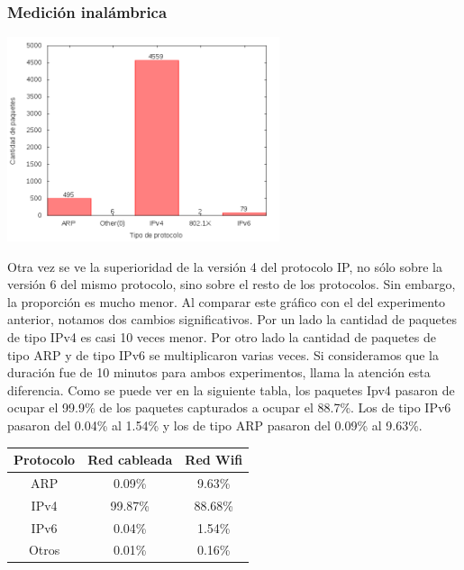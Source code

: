 \subsubsection{Medición inalámbrica}

\begin{center}
\includegraphics[width=8cm]{../mediciones/home-wfi-10/home-wfi-10Protocolos.png}
\end{center}

Otra vez se ve la superioridad de la versión 4 del protocolo IP, no sólo sobre la versión 6 del mismo protocolo, sino sobre el resto de los protocolos.
Sin embargo, la proporción es mucho menor. Al comparar este gráfico con el del experimento anterior, notamos dos cambios significativos. Por un lado la cantidad
de paquetes de tipo IPv4 es casi 10 veces menor. Por otro lado la cantidad de paquetes de tipo ARP y de tipo IPv6 se multiplicaron varias veces. Si consideramos
que la duración fue de 10 minutos para ambos experimentos, llama la atención esta diferencia. Como se puede ver en la siguiente tabla, los paquetes Ipv4 pasaron
de ocupar el 99.9\% de los paquetes capturados a ocupar el 88.7\%. Los de tipo IPv6 pasaron del 0.04\% al 1.54\% y los de tipo ARP pasaron del 0.09\% al 9.63\%.

\begin{center}
\begin{tabular}{|c||c|c|}
\hline
Protocolo & Red cableada & Red Wifi \\
\hline
ARP & 0.09\% & 9.63\% \\
\hline
IPv4 & 99.87\% & 88.68\% \\
\hline
IPv6 & 0.04\% & 1.54\% \\
\hline
Otros & 0.01\% & 0.16\% \\
\hline
\end{tabular}
\end{center}

